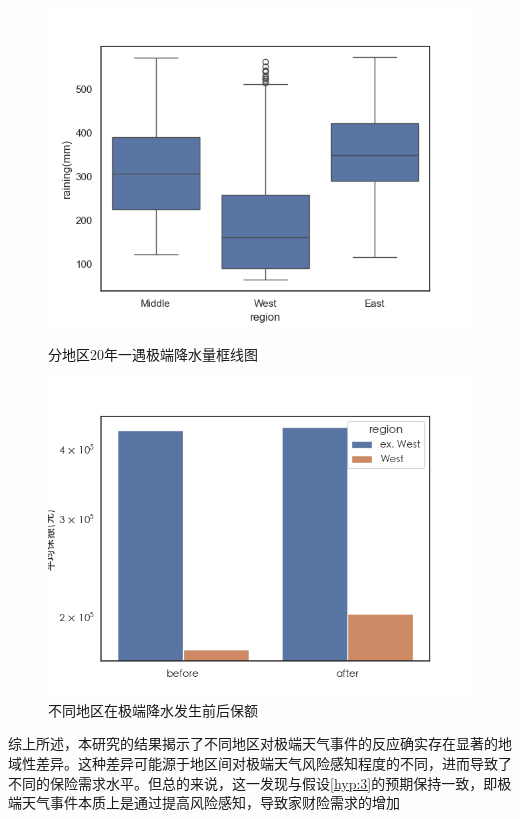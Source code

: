 \begin{figure}[H]
    \centering
    \begin{minipage}{0.48\linewidth}
        \includegraphics[width=\linewidth]{lib/img/rainings.png}
        \caption{分地区20年一遇极端降水量框线图}\label{fig:rainings}
    \end{minipage}
    \begin{minipage}{0.48\linewidth}
        \includegraphics[width=\linewidth]{lib/img/covbyregion.png}
        \caption{不同地区在极端降水发生前后保额}\label{fig:covbyregion}
    \end{minipage}
\end{figure}

综上所述，本研究的结果揭示了不同地区对极端天气事件的反应确实存在显著的地域性差异。这种差异可能源于地区间对极端天气风险感知程度的不同，进而导致了不同的保险需求水平。但总的来说，这一发现与假设\ref{hyp:3}的预期保持一致，即极端天气事件本质上是通过提高风险感知，导致家财险需求的增加

